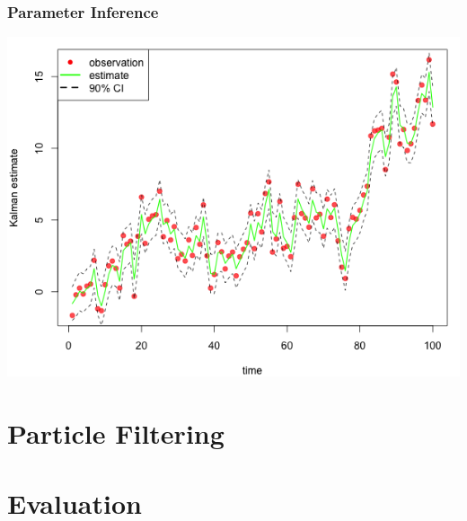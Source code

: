 \documentclass[11pt]{beamer}
\begin{document}
\begin{frame}
\frametitle{Parameter Inference}
\centering
\includegraphics[scale=0.45]{ullm-estimate-kalman}
\end{frame}

\section{Particle Filtering}



\section{Evaluation}
\end{document}
